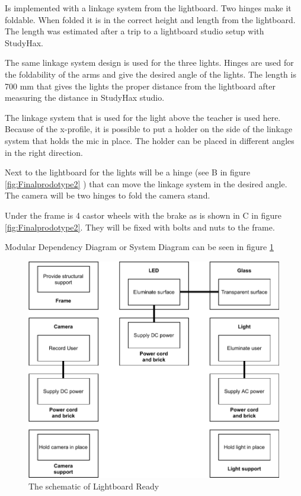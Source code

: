 \documentclass[a4paper]{jpconf}
\begin{document}
	
	\textbf{} Is implemented with a linkage system from the lightboard.
	Two hinges make it foldable.
	When folded it is in the correct height and length from the lightboard.
	The length was estimated after a trip to a lightboard studio setup with StudyHax.
	
	\textbf{} The same linkage system design is used for the three lights.
	Hinges are used for the foldability of the arms and give the desired angle of the lights.
	The length is 700 mm that gives the lights the proper distance from the lightboard after measuring the distance in StudyHax studio.
	
	\textbf{} The linkage system that is used for the light above the teacher is used here.
	Because of the x-profile, it is possible to put a holder on the side of the linkage system that holds the mic in place.
	The holder can be placed in different angles in the right direction.
	
	\textbf{} Next to the lightboard for the lights will be a hinge (see B in figure \ref{fig:Finalprodotype2} ) that can move the linkage system in the desired angle.
	The camera will be two hinges to fold the camera stand.
	
	\textbf{} Under the frame is 4 castor wheels with the brake as is shown in C in figure \ref{fig:Finalprodotype2}.
	They will be fixed with bolts and nuts to the frame.
	
	Modular Dependency Diagram or System Diagram can be seen in figure \ref{fig:scematic}
	\begin{figure}
		\centering
		\includegraphics[width=0.7\linewidth]{scematic.pdf}
		\caption{The schematic of Lightboard Ready}
		\label{fig:scematic}
	\end{figure}
	
\end{document}

